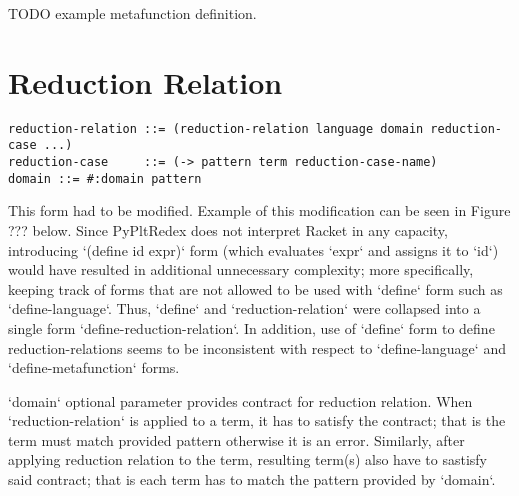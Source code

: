 TODO example metafunction definition.

\section{Reduction Relation}

\begin{lstlisting}
reduction-relation ::= (reduction-relation language domain reduction-case ...)
reduction-case     ::= (-> pattern term reduction-case-name)
domain ::= #:domain pattern
\end{lstlisting}

This form had to be modified. Example of this modification can be seen in Figure ??? below. Since PyPltRedex does not interpret Racket in any capacity, introducing `(define id expr)` form (which evaluates `expr` and assigns it to `id`) would have resulted in additional unnecessary complexity; more specifically, keeping track of forms that are not allowed to be used with `define` form such as `define-language`. Thus, `define` and `reduction-relation` were collapsed into a single form `define-reduction-relation`. In addition, use of `define` form to define reduction-relations seems to be inconsistent with respect to `define-language` and `define-metafunction` forms.


`domain` optional parameter provides contract for reduction relation. When `reduction-relation` is applied to a term, it has to satisfy the contract; that is the term must match provided pattern otherwise it is an error. Similarly, after applying reduction relation to the term, resulting term(s) also have to sastisfy said contract; that is each term has to match the pattern provided by `domain`.

\CheckConstraintT






